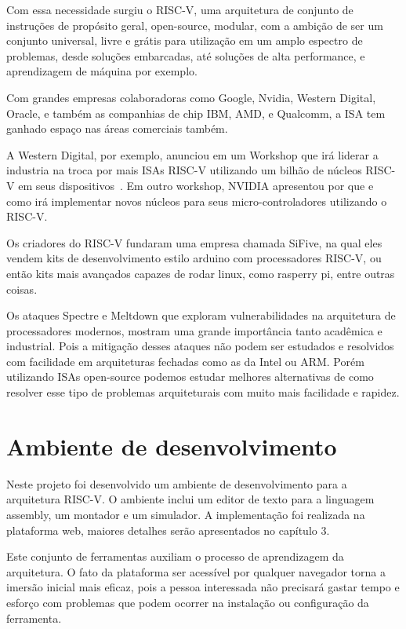 		Com essa necessidade surgiu o RISC-V, uma arquitetura de conjunto de instruções de propósito geral, open-source, modular, com a ambição de ser um conjunto universal, livre e grátis para utilização em um amplo espectro de problemas, desde soluções embarcadas, até soluções de alta performance, e aprendizagem de máquina por exemplo.

		Com grandes empresas colaboradoras como Google, Nvidia, Western Digital, Oracle, e também as companhias de chip IBM, AMD, e Qualcomm, a ISA tem ganhado espaço nas áreas comerciais também.

		A Western Digital, por exemplo, anunciou em um Workshop que irá liderar a industria na troca por mais ISAs RISC-V utilizando um bilhão de núcleos RISC-V em seus dispositivos~\cite{riscv_commercial}. Em outro workshop, NVIDIA apresentou por que e como irá implementar novos núcleos para seus micro-controladores utilizando o RISC-V.~\cite{riscv_nvidia}

		Os criadores do RISC-V fundaram uma empresa chamada SiFive, na qual eles vendem kits de desenvolvimento estilo arduino com processadores RISC-V, ou então kits mais avançados capazes de rodar linux, como rasperry pi, entre outras coisas.

		Os ataques Spectre e Meltdown que exploram vulnerabilidades na arquitetura de processadores modernos, mostram uma grande importância tanto acadêmica e industrial. Pois a mitigação desses ataques não podem ser estudados e resolvidos com facilidade em arquiteturas fechadas como as da Intel ou ARM. Porém utilizando ISAs open-source podemos estudar melhores alternativas de como resolver esse tipo de problemas arquiteturais com muito mais facilidade e rapidez.



	\section{Ambiente de desenvolvimento}

		Neste projeto foi desenvolvido um ambiente de desenvolvimento para a arquitetura RISC-V. O ambiente inclui um editor de texto para a linguagem assembly, um montador e um simulador. A implementação foi realizada na plataforma web, maiores detalhes serão apresentados no capítulo 3. 

		Este conjunto de ferramentas auxiliam o processo de aprendizagem da arquitetura. O fato da plataforma ser acessível por qualquer navegador torna a imersão inicial mais eficaz, pois a pessoa interessada não precisará gastar tempo e esforço com problemas que podem ocorrer na instalação ou configuração da ferramenta.

